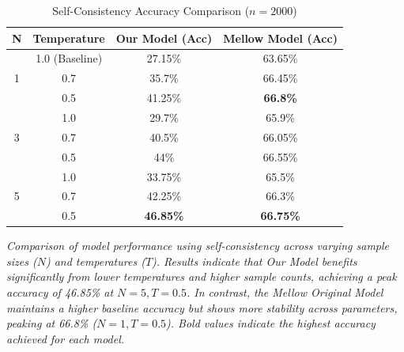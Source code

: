 \documentclass[cameraready]{Interspeech}
\begin{document}
\newpage
\newpage
\begin{table}[h!]
    \centering
    \caption{Self-Consistency Accuracy Comparison ($n=2000$)}
    \label{tab:sc_results}
    \begin{threeparttable}
    \setlength{\tabcolsep}{3pt}
    \begin{tabular}{@{}cccc@{}}
        \toprule
        \textbf{N} & \textbf{Temperature} & \textbf{Our Model (Acc)} & \textbf{Mellow Model (Acc)} \\ \midrule
        \multirow{3}{*}{1} & 1.0 (Baseline) & 27.15\% & 63.65\% \\
                           & 0.7            & 35.7\%  & 66.45\% \\
                           & 0.5            & 41.25\% & \textbf{66.8\%} \\ \midrule
        \multirow{3}{*}{3} & 1.0            & 29.7\%  & 65.9\% \\
                           & 0.7            & 40.5\%  & 66.05\% \\
                           & 0.5            & 44\%    & 66.55\% \\ \midrule
        \multirow{3}{*}{5} & 1.0            & 33.75\% & 65.5\% \\
                           & 0.7            & 42.25\% & 66.3\% \\
                           & 0.5            & \textbf{46.85\%}     & \textbf{66.75\%} \\ \bottomrule
    \end{tabular}
    \begin{tablenotes}
      \small
      \item \textit{Comparison of model performance using self-consistency across varying sample sizes ($N$) and temperatures ($T$). Results indicate that Our Model benefits significantly from lower temperatures and higher sample counts, achieving a peak accuracy of 46.85\% at $N=5, T=0.5$. In contrast, the Mellow Original Model maintains a higher baseline accuracy but shows more stability across parameters, peaking at 66.8\% ($N=1, T=0.5$). Bold values indicate the highest accuracy achieved for each model.}
    \end{tablenotes}
    \end{threeparttable}
\end{table}
\end{document}
